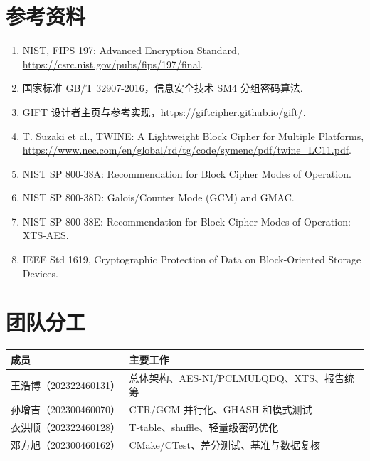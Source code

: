 \documentclass[a4paper,12pt]{ctexart}
\begin{document}
\section*{参考资料}
\begin{enumerate}
  \item NIST, FIPS 197: Advanced Encryption Standard, \url{https://csrc.nist.gov/pubs/fips/197/final}.
  \item 国家标准 GB/T 32907-2016，信息安全技术 SM4 分组密码算法.
  \item GIFT 设计者主页与参考实现，\url{https://giftcipher.github.io/gift/}.
  \item T. Suzaki et al., TWINE: A Lightweight Block Cipher for Multiple Platforms, \url{https://www.nec.com/en/global/rd/tg/code/symenc/pdf/twine_LC11.pdf}.
  \item NIST SP 800-38A: Recommendation for Block Cipher Modes of Operation.
  \item NIST SP 800-38D: Galois/Counter Mode (GCM) and GMAC.
  \item NIST SP 800-38E: Recommendation for Block Cipher Modes of Operation: XTS-AES.
  \item IEEE Std 1619, Cryptographic Protection of Data on Block-Oriented Storage Devices.
\end{enumerate}

\section*{团队分工}
\begin{tabular}{p{4.0cm}p{10.3cm}}
\toprule
成员 & 主要工作\\
\midrule
王浩博（202322460131） & 总体架构、AES-NI/PCLMULQDQ、XTS、报告统筹\\
孙增吉（202300460070） & CTR/GCM 并行化、GHASH 和模式测试\\
衣洪顺（202322460128） & T-table、shuffle、轻量级密码优化\\
邓方旭（202300460162） & CMake/CTest、差分测试、基准与数据复核\\
\bottomrule
\end{tabular}
\end{document}
